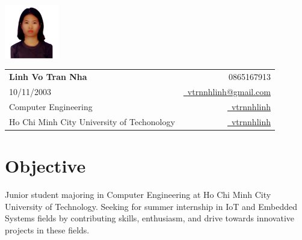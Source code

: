 \documentclass[a4paper,11pt]{article}
\makeatletter
\newcommand{\name}{Linh Vo Tran Nha} %
\newcommand{\phone}{0865167913} %
\newcommand{\emailb}{vtrnnhlinh@gmail.com} %
\newcommand{\dob}{10/11/2003} %
\makeatother
\begin{document}
\selectfont


\parbox{2.35cm}{%
  \includegraphics[width=2.35cm,clip]{avatar.png}
}
\parbox{\dimexpr\linewidth-2.8cm\relax}{
  \begin{tabularx}{\linewidth}{L r}                                                                                                                                                   \\
    \textbf{\Large \name}                        & {\raisebox{0.0\height}{\footnotesize \faPhone}\ \phone}                                                              \\
    \dob                                         & \href{mailto:\emailb}{\raisebox{0.0\height}{\footnotesize \faEnvelope}\ {\emailb}}                                   \\
    {Computer Engineering}                       & \href{https://github.com/vtrnnhlinh}{\raisebox{0.0\height}{\footnotesize \faGithub}\ {vtrnnhlinh}}               \\
    {Ho Chi Minh City University of Techonology} & \href{https://www.linkedin.com/in/vtrnnhlinh/}{\raisebox{0.0\height}{\footnotesize \faLinkedin}\ {vtrnnhlinh}}
  \end{tabularx}
}

\section{\textbf{Objective}}
\begin{itemize}[leftmargin=0.05in, label={}]
  \small{\item{
                {Junior student majoring in Computer Engineering at Ho Chi Minh City University of Technology. Seeking for summer internship in IoT and Embedded Systems fields by contributing skills, enthusiasm, and drive towards innovative projects in these fields.} \\
          }}
\end{itemize}


\end{document}
